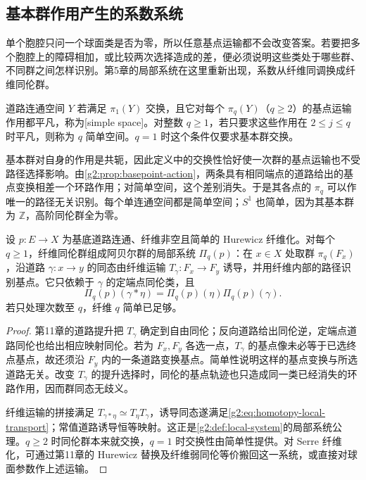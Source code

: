 \subsection{基本群作用产生的系数系统}
\label{g2:subsec:1201:03}

单个胞腔只问一个球面类是否为零，所以任意基点运输都不会改变答案。若要把多个胞腔上的障碍相加，或比较两次选择造成的差，便必须说明这些类处于哪些群、不同群之间怎样识别。第5章的局部系统在这里重新出现，系数从纤维同调换成纤维同伦群。

\begin{definition}[简单空间]\label{g2:def:simple-space}
	道路连通空间 \(Y\) 若满足 \(\pi_1(Y)\) 交换，且它对每个 \(\pi_q(Y)\)（\(q\ge2\)）的基点运输作用都平凡，称为[simple space]。对整数 \(q\ge1\)，若只要求这些作用在 \(2\le j\le q\) 时平凡，则称为 \(q\) 简单空间。\(q=1\) 时这个条件仅要求基本群交换。
\end{definition}

基本群对自身的作用是共轭，因此定义中的交换性恰好使一次群的基点运输也不受路径选择影响。由\cref{g2:prop:basepoint-action}，两条具有相同端点的道路给出的基点变换相差一个环路作用；对简单空间，这个差别消失。于是其各点的 \(\pi_q\) 可以作唯一的路径无关识别。每个单连通空间都是简单空间；\(S^1\) 也简单，因为其基本群为 \(\mathbb Z\)，高阶同伦群全为零。

\begin{proposition}\label{g2:prop:homotopy-local-system}
	设 \(p:E\to X\) 为基底道路连通、纤维非空且简单的 Hurewicz 纤维化。对每个 \(q\ge1\)，纤维同伦群组成阿贝尔群的局部系统 \(\Pi_q(p)\)：在 \(x\in X\) 处取群 \(\pi_q(F_x)\)，沿道路 \(\gamma:x\to y\) 的同态由纤维运输 \(T_\gamma:F_x\to F_y\) 诱导，并用纤维内部的路径识别基点。它只依赖于 \(\gamma\) 的定端点同伦类，且
	\begin{equation}\label{g2:eq:homotopy-local-transport}
		\Pi_q(p)(\gamma*\eta)=\Pi_q(p)(\eta)\Pi_q(p)(\gamma).
	\end{equation}
	若只处理次数至 \(q\)，纤维 \(q\) 简单已足够。
\end{proposition}
\begin{proof}
	第11章的道路提升把 \(T_\gamma\) 确定到自由同伦；反向道路给出同伦逆，定端点道路同伦也给出相应映射同伦。若为 \(F_x,F_y\) 各选一点，\(T_\gamma\) 的基点像未必等于已选终点基点，故还须沿 \(F_y\) 内的一条道路变换基点。简单性说明这样的基点变换与所选道路无关。改变 \(T_\gamma\) 的提升选择时，同伦的基点轨迹也只造成同一类已经消失的环路作用，因而群同态无歧义。

	纤维运输的拼接满足 \(T_{\gamma*\eta}\simeq T_\eta T_\gamma\)，诱导同态遂满足\eqref{g2:eq:homotopy-local-transport}；常值道路诱导恒等映射。这正是\cref{g2:def:local-system}的局部系统公理。\(q\ge2\) 时同伦群本来就交换，\(q=1\) 时交换性由简单性提供。对 Serre 纤维化，可通过第11章的 Hurewicz 替换及纤维弱同伦等价搬回这一系统，或直接对球面参数作上述运输。
\end{proof}

